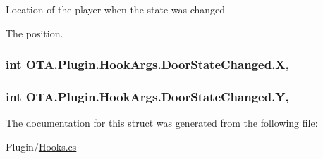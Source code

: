 Location of the player when the state was changed 

The position.\hypertarget{struct_o_t_a_1_1_plugin_1_1_hook_args_1_1_door_state_changed_ae4eb7012a7fc1b76f7eb0db002da9523}{}
\subsubsection[{X}]{\setlength{\rightskip}{0pt plus 5cm}int O\+T\+A.\+Plugin.\+Hook\+Args.\+Door\+State\+Changed.\+X\hspace{0.3cm}{\ttfamily [get]}, {\ttfamily [set]}}\label{struct_o_t_a_1_1_plugin_1_1_hook_args_1_1_door_state_changed_ae4eb7012a7fc1b76f7eb0db002da9523}
\hypertarget{struct_o_t_a_1_1_plugin_1_1_hook_args_1_1_door_state_changed_a958a9ab658ba0cb42f507c7d483d6213}{}
\subsubsection[{Y}]{\setlength{\rightskip}{0pt plus 5cm}int O\+T\+A.\+Plugin.\+Hook\+Args.\+Door\+State\+Changed.\+Y\hspace{0.3cm}{\ttfamily [get]}, {\ttfamily [set]}}\label{struct_o_t_a_1_1_plugin_1_1_hook_args_1_1_door_state_changed_a958a9ab658ba0cb42f507c7d483d6213}


The documentation for this struct was generated from the following file\+:\begin{DoxyCompactItemize}
\item 
Plugin/\hyperlink{_hooks_8cs}{Hooks.\+cs}\end{DoxyCompactItemize}
